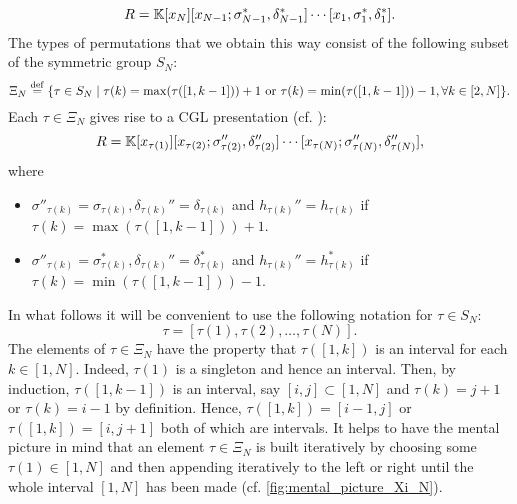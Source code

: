 \begin{equation*}
	R = \mathbb{K}[x_N][x_{N-1}; \sigma_{N-1}^*, \delta_{N-1}^*]\cdots [x_1, \sigma_1^*, \delta_1^*].
\end{equation*}
%
The types of permutations that we obtain this way consist of the following subset of
the symmetric group $S_N$:
\begin{equation*}
	\Xi_N \overset{\mathrm{def}}{=} \{\tau \in S_N \mid \tau(k) = \max (\tau ([1, k-1])) + 1 \text{ or } \tau(k) = \min (\tau ([1, k-1])) - 1, \forall k \in [2, N]\}.
\end{equation*}
%
Each $\tau \in \Xi_N$ gives rise to a CGL presentation (cf. \cite[Proposition
	3.14]{GoodearlYakimov2017QCA}):
\begin{equation}\label{eq:cgl_presentation_tau}
	R = \mathbb{K}[x_{\tau(1)}][x_{\tau(2)}; \sigma_{\tau(2)}'', \delta_{\tau(2)}''] \cdots [x_{\tau(N)}; \sigma_{\tau(N)}'', \delta_{\tau(N)}''],
\end{equation}
%
where
\begin{itemize}
	\item $\sigma''_{\tau(k)} = \sigma_{\tau(k)}, \delta_{\tau(k)}'' = \delta_{\tau(k)}$
	      and $h_{\tau(k)}'' = h_{\tau(k)}$ if $\tau(k) = \max(\tau([1,k-1])) + 1$.
	\item
	      $\sigma''_{\tau(k)} = \sigma^*_{\tau(k)}, \delta_{\tau(k)}'' = \delta^*_{\tau(k)}$ and
	      $h_{\tau(k)}'' = h_{\tau(k)}^*$ if $\tau(k) = \min(\tau([1,k-1])) - 1$.
\end{itemize}

In what follows it will be convenient to use the following notation for $\tau \in S_N$:
\begin{equation*}
	\tau = [\tau(1), \tau(2), \dots, \tau(N)].
\end{equation*}
%
The elements of $\tau \in \Xi_N$ have the property that $\tau([1, k])$ is an interval
for each $k \in [1, N]$. Indeed, $\tau(1)$ is a singleton and hence an interval. Then,
by induction, $\tau([1, k-1])$ is an interval, say $[i, j] \subset [1, N]$ and $\tau(k)
	= j + 1$ or $\tau(k) = i - 1$ by definition. Hence, $\tau([1, k]) = [i-1, j]$ or
$\tau([1, k]) = [i, j+1]$ both of which are intervals. It helps to have the mental
picture in mind that an element $\tau \in \Xi_N$ is built iteratively by choosing some
$\tau(1) \in [1, N]$ and then appending iteratively to the left or right until the
whole interval $[1, N]$ has been made (cf. \cref{fig:mental_picture_Xi_N}).

